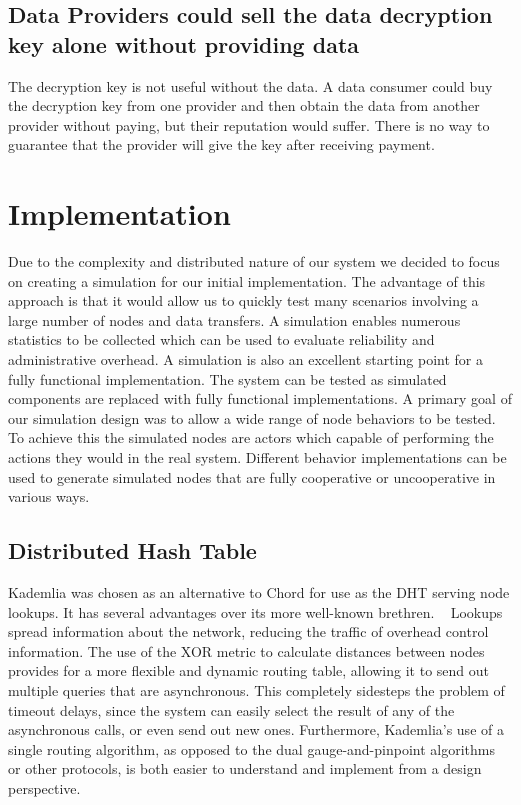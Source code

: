 \documentclass[%
				10pt,
        final,
        notitlepage,
        narroweqnarray,
        inline,
        twoside,
        ]{ieee}
\begin{document}
\subsection{Data Providers could sell the data decryption key alone without providing data}
The decryption key is not useful without the data. A data consumer could buy the decryption key from one provider and then obtain the data from another provider without paying, but their reputation would suffer.  There is no way to guarantee that the provider will give the key after receiving payment.

\section{Implementation}
Due to the complexity and distributed nature of our system we decided to focus on creating a simulation for our initial implementation.  The advantage of this approach is that it would allow us to quickly test many scenarios involving a large number of nodes and data transfers. A simulation enables numerous statistics to be collected which can be used to evaluate reliability and administrative overhead.  A simulation is also an excellent starting point for a fully functional implementation.  The system can be tested as simulated components are replaced with fully functional implementations. A primary goal of our simulation design was to allow a wide range of node behaviors to be tested.  To achieve this the simulated nodes are actors which capable of performing the actions they would in the real system.  Different behavior implementations can be used to generate simulated nodes that are fully cooperative or uncooperative in various ways. 

\subsection{Distributed Hash Table}
Kademlia was chosen as an alternative to Chord for use as the DHT serving node 
lookups.  It has several advantages over its more well-known brethren. 
~\cite{maymounkov} Lookups spread information about the network, reducing the 
traffic of overhead control information.  The use of the XOR metric to 
calculate distances between nodes provides for a more flexible and dynamic 
routing table, allowing it to send out multiple queries that are asynchronous.  
This completely sidesteps the problem of timeout delays, since the system can 
easily select the result of any of the asynchronous calls, or even send out new 
ones.  Furthermore, Kademlia's use of a single routing algorithm, as opposed to 
the dual gauge-and-pinpoint algorithms or other protocols, is both easier to 
understand and implement from a design perspective.
\end{document}
